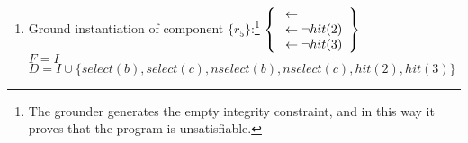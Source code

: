 \begin{Loesung}
\begin{UList}
\begin{description}
{\begin{enumerate}
  \( \left\{
  \begin{array}{r@{}c@{}l}
    hit(2) & {} \leftarrow {} & select(b)\\
    hit(2) & {} \leftarrow {} & select(c)\\
    hit(3) & {} \leftarrow {} & select(b)
  \end{array}
  \right\}
  \)
  \\
  $F = I$ 
  \\ 
  $D = I \cup \{ select(b), select(c), nselect(b), nselect(c), hit(2), hit(3) \}$
  \item Ground instantiation of component $\{r_5\}$:\footnote{%
  The grounder generates the empty integrity constraint, 
  and in this way it proves that the program is unsatisfiable.}
  \( \left\{
  \begin{array}{r@{}c@{}l}
    & {} \leftarrow {} & \\
    & {} \leftarrow {} & \naf{hit(2)}\\
    & {} \leftarrow {} & \naf{hit(3)}\\
  \end{array}
  \right\}
  \)
  \\
  $F = I$ 
  \\ 
  $D = I \cup \{ select(b), select(c), nselect(b), nselect(c), hit(2), hit(3) \}$
\end{enumerate}
}
%
\end{description}
%
\item 
{}
\end{UList}
\end{Loesung}
